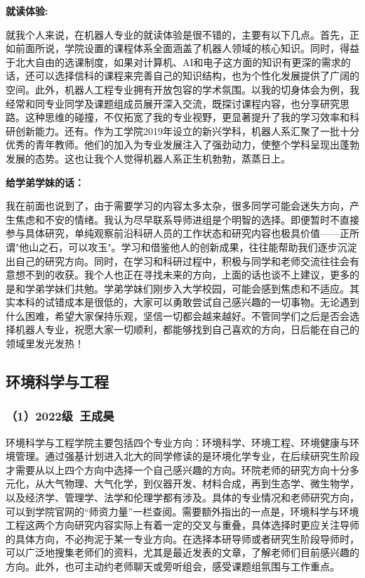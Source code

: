 \documentclass[11pt,oneside]{book}
\begin{document}
\vspace{10pt}

\textbf{就读体验:}

就我个人来说，在机器人专业的就读体验是很不错的，主要有以下几点。首先，正如前面所说，学院设置的课程体系全面涵盖了机器人领域的核心知识。同时，得益于北大自由的选课制度，如果对计算机、AI和电子这方面的知识有更深的需求的话，还可以选择信科的课程来完善自己的知识结构，也为个性化发展提供了广阔的空间。此外，机器人工程专业拥有开放包容的学术氛围。以我的切身体会为例，我经常和同专业同学及课题组成员展开深入交流，既探讨课程内容，也分享研究思路。这种思维的碰撞，不仅拓宽了我的专业视野，更显著提升了我的学习效率和科研创新能力。还有。作为工学院2019年设立的新兴学科，机器人系汇聚了一批十分优秀的青年教师。他们的加入为专业发展注入了强劲动力，使整个学科呈现出蓬勃发展的态势。这也让我个人觉得机器人系正生机勃勃，蒸蒸日上。

\vspace{10pt}

\textbf{给学弟学妹的话：}

我在前面也说到了，由于需要学习的内容太多太杂，很多同学可能会迷失方向，产生焦虑和不安的情绪。我认为尽早联系导师进组是个明智的选择。即便暂时不直接参与具体研究，单纯观察前沿科研人员的工作状态和研究内容也极具价值——正所谓"他山之石，可以攻玉"。学习和借鉴他人的创新成果，往往能帮助我们逐步沉淀出自己的研究方向。同时，在学习和科研过程中，积极与同学和老师交流往往会有意想不到的收获。我个人也正在寻找未来的方向，上面的话也谈不上建议，更多的是和学弟学妹们共勉。学弟学妹们刚步入大学校园，可能会感到焦虑和不适应。其实本科的试错成本是很低的，大家可以勇敢尝试自己感兴趣的一切事物。无论遇到什么困难，希望大家保持乐观，坚信一切都会越来越好。不管同学们之后是否会选择机器人专业，祝愿大家一切顺利，都能够找到自己喜欢的方向，日后能在自己的领域里发光发热！

\subsection{环境科学与工程}

\subsubsection{（1）2022级\ 王成昊}

环境科学与工程学院主要包括四个专业方向：环境科学、环境工程、环境健康与环境管理。通过强基计划进入北大的同学修读的是环境化学专业，在后续研究生阶段才需要从以上四个方向中选择一个自己感兴趣的方向。环院老师的研究方向十分多元化，从大气物理、大气化学，到仪器开发、材料合成，再到生态学、微生物学，以及经济学、管理学、法学和伦理学都有涉及。具体的专业情况和老师研究方向，可以到学院官网的“师资力量”一栏查阅。需要额外指出的一点是，环境科学与环境工程这两个方向研究内容实际上有着一定的交叉与重叠，具体选择时更应关注导师的具体方向，不必拘泥于某一专业方向。在选择本研导师或者研究生阶段导师时，可以广泛地搜集老师们的资料，尤其是最近发表的文章，了解老师们目前感兴趣的方向。此外，也可主动约老师聊天或旁听组会，感受课题组氛围与工作重点。
\end{document}
